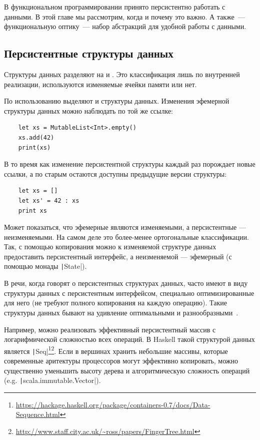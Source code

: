 

В функциональном программировании принято персистентно работать с данными.
В этой главе мы рассмотрим, когда и почему это важно.
А также~--- функциональную оптику~--- набор абстракций для удобной работы с данными.

\subsection{Персистентные структуры данных}

Структуры данных разделяют на  и .
Это классификация лишь по внутренней реализации, используются изменяемые ячейки памяти или нет.

По использованию выделяют  и  структуры данных. %
Изменения эфемерной структуры данных можно наблюдать по той же ссылке:
\begin{verbatim}
    let xs = MutableList<Int>.empty()
    xs.add(42)
    print(xs)
\end{verbatim}
В то время как изменение персистентной структуры каждый раз порождает новые ссылки, а по старым остаются доступны предыдущие версии структуры:
\begin{verbatim}
    let xs = []
    let xs' = 42 : xs
    print xs
\end{verbatim}

Может показаться, что эфемерные являются изменяемыми, а персистентные --- неизменяемыми.
На самом деле это более-менее ортогональные классификации.
Так, с помощью копирования можно к изменяемой структуре данных предоставить персистентный интерфейс, а неизменяемой --- эфемерный (с помощью монады \texttt|State|).

В речи, когда говорят о персистентных структурах данных, часто имеют в виду структуры данных с персистентным интерфейсом, специально оптимизированные для него (не требуют полного копирования на каждую операцию).
Такие структуры данных бывают на удивление оптимальными и разнообразными~\cite{okasaki1999purely}.

Например, можно реализовать эффективный персистентный массив с логарифмической сложностью всех операций.
В Haskell такой структурой данных является \texttt|Seq|\footnote{\url{https://hackage.haskell.org/package/containers-0.7/docs/Data-Sequence.html}}\footnote{\url{http://www.staff.city.ac.uk/~ross/papers/FingerTree.html}}.
Если в вершинах хранить небольшие массивы, которые современные аритектуры процессоров могут эффективно копировать, можно существенно уменьшить высоту дерева и алгоритмическую сложность операций (e.g. \texttt|scala.immutable.Vector|).


